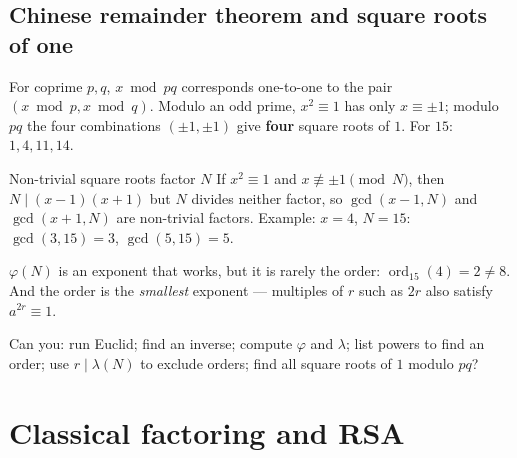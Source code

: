 \documentclass[11pt,a4paper,openany]{book}
\begin{document}
\subsection{Chinese remainder theorem and square roots of one}
For coprime $p, q$, $x \bmod pq$ corresponds one-to-one to the pair $(x \bmod p, x \bmod q)$. Modulo an odd prime, $x^2 \equiv 1$ has only $x \equiv \pm1$; modulo
$pq$ the four combinations $(\pm1, \pm1)$ give \textbf{four} square roots of $1$. For $15$: $1, 4, 11, 14$.
\begin{keyres}{Non-trivial square roots factor $N$}
If $x^2 \equiv 1$ and $x \not\equiv \pm1 \pmod N$, then $N \mid (x - 1)(x + 1)$ but $N$ divides neither factor, so $\gcd(x - 1, N)$ and $\gcd(x + 1, N)$ are
non-trivial factors. Example: $x = 4$, $N = 15$: $\gcd(3, 15) = 3$, $\gcd(5, 15) = 5$.
\end{keyres}
\begin{trap}
$\varphi(N)$ is an exponent that works, but it is rarely the order: $\operatorname{ord}_{15}(4) = 2 \ne 8$. And the order is the \emph{smallest} exponent ---
multiples of $r$ such as $2r$ also satisfy $a^{2r} \equiv 1$.
\end{trap}
\begin{checklist}
Can you: run Euclid; find an inverse; compute $\varphi$ and $\lambda$; list powers to find an order; use $r \mid \lambda(N)$ to exclude orders; find all square roots
of $1$ modulo $pq$?
\end{checklist}

\section{Classical factoring and RSA}
\end{document}
